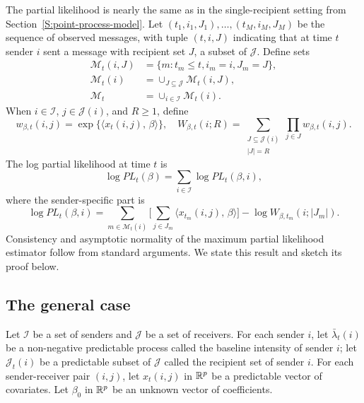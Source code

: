\documentclass[aoas,preprint]{imsart}
\begin{document}
The partial likelihood is nearly the same as in the single-recipient
setting from Section~\ref{S:point-process-model}.
Let $(t_1, i_1, J_1), \ldots, (t_M, i_M, J_M)$ be the sequence of
observed messages, with tuple $(t, i, J)$ indicating that at time $t$
sender $i$ sent a message with recipient set
$J$, a subset of $\mathcal{J}$.  Define sets
\begin{align*}
    \mathcal{M}_t(i, J)
        &= \{ m : t_m \leq t, i_m = i, J_m = J \}, \\
    \mathcal{M}_t(i)
        &= \cup_{J \subseteq \mathcal{J}} \mathcal{M}_t(i, J), \\
    \mathcal{M}_t
        &= \cup_{i \in \mathcal{I}} \mathcal{M}_t(i).
\end{align*}
When $i \in \mathcal{I}$, $j \in \mathcal{J}(i)$, and $R \geq 1$, define
\[
    w_{\beta,t}(i,j) = \exp\{ \langle x_t(i,j), \, \beta \rangle \},
    \quad
    W_{\beta,t}(i; R)
    =
    \!\!
    \sum_{\substack{J \subseteq \mathcal{J}(i)\\ |J| = R}}
        \prod_{j \in J}
            w_{\beta,t}(i,j).
\]
The log partial likelihood at time $t$ is
\begin{equation}\label{E:log-pl-multiple}
    \log \mathit{PL}_t(\beta)
        =
        \sum_{i \in \mathcal{I}}
        \log \mathit{PL}_t(\beta, i),
\end{equation}
where the sender-specific part is
\begin{equation}\label{E:sender-log-pl-multiple}
    \log \mathit{PL}_t(\beta, i)
        =
        \sum_{m \in \mathcal{M}_t(i)}
        \Big[
            \sum_{j \in J_m}
                \langle x_{t_m}\!(i, j), \, \beta \rangle
        \Big]
            -
            \log W_{\beta,t_m} (i ; |J_m|).
\end{equation}
Consistency and asymptotic normality of the maximum partial likelihood
estimator follow from standard arguments.  We state this result and
sketch its proof below.

\subsection{The general case}
Let $\mathcal{I}$ be a set of senders and $\mathcal{J}$ be a set of
receivers.  
For each sender $i$, let $\bar \lambda_t(i)$ be a non-negative predictable
process called the baseline intensity of sender $i$; let
$\mathcal{J}_t(i)$ be a predictable subset of $\mathcal{J}$ called the 
recipient set of sender $i$.
For each sender-receiver pair $(i,j)$, let $x_t(i,j)$ in $\mathbb{R}^p$ be a
predictable vector of covariates.  Let $\beta_0$ in $\mathbb{R}^p$
be an unknown vector of coefficients.
\end{document}
